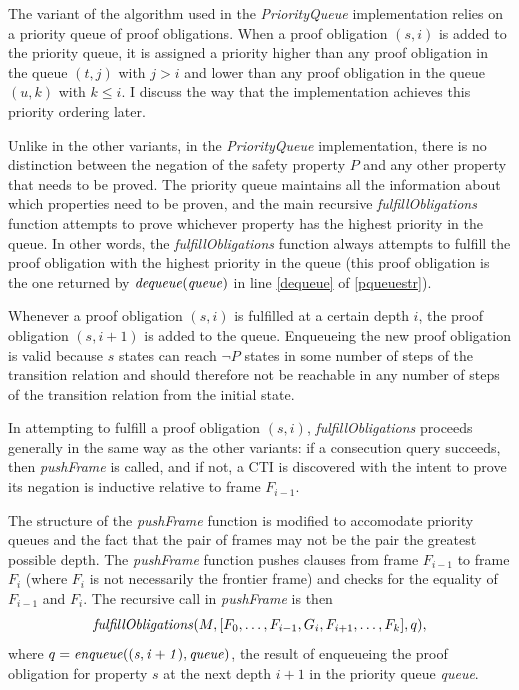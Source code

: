 \documentclass[12pt,a4paper,twoside,openright]{report}
\begin{document}
{The variant of the algorithm used in the {\it PriorityQueue} implementation
relies on a priority queue of proof obligations.
When a proof obligation $(s,i)$ is added to the priority queue,
it is assigned a priority higher than any proof obligation in the queue $(t,j)$ with $j > i$
and lower than any proof obligation in the queue $(u,k)$ with $k \leq i$. I discuss the
way that the implementation achieves this priority ordering later.

Unlike in the other variants, in the {\it PriorityQueue} implementation, there is
no distinction between the negation of the safety property $P$ and any other property that needs
to be proved. The priority queue maintains all the information about which properties need to be proven,
and the main recursive {\it fulfillObligations} function attempts to prove whichever property has the highest
priority in the queue. In other words, the {\it fulfillObligations} function always 
attempts to fulfill the proof obligation with the highest priority in the queue (this proof obligation
is the one returned by ${\it dequeue(queue)}$ in line \ref{dequeue} of \ref{pqueuestr}).

Whenever a proof obligation $(s,i)$ is fulfilled at a certain depth $i$, the proof obligation
$(s, i + 1)$ is added to the queue. Enqueueing the new proof obligation is valid
because $s$ states can reach $\neg P$ states in some
number of steps of the transition relation and should therefore
not be reachable in any number of steps of the transition relation from the initial state.

In attempting to fulfill a proof obligation $(s,i)$, {\it fulfillObligations} proceeds
generally in the same way as the other variants: if a consecution query succeeds,
then {\it pushFrame} is called, and if not, a CTI is discovered with the intent to
prove its negation is inductive relative to frame $F_{i - 1}$.

The structure of the {\it pushFrame} function is modified to accomodate priority queues
and the fact that the pair of frames may not be the pair the greatest possible depth.
The {\it pushFrame} function pushes clauses from frame $F_{i - 1}$ to frame $F_i$ (where
$F_i$ is not necessarily the frontier frame) and checks
for the equality of $F_{i - 1}$ and $F_i$.
The recursive call in {\it pushFrame} is then
$${\it fulfillObligations}(M,[F_0,\ldots,F_{i - 1},G_i,F_{i + 1}, \ldots, F_k], q),$$
where $q = {\it enqueue((s, i+1), queue)}$, the result of enqueueing the proof obligation
for property $s$ at the next depth $i + 1$ in the priority queue {\it queue}.

}
\end{document}
